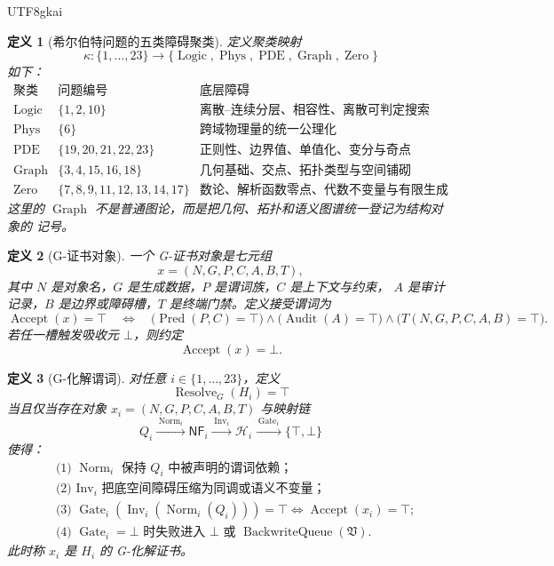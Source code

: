 \documentclass[12pt]{article}
\newtheorem{definition}{定义}[section]
\newcommand{\Vsys}{\mathfrak V}
\newcommand{\NF}{\mathsf{NF}}
\newcommand{\CertTuple}{(N,G,P,C,A,B,T)}
\newcommand{\Hcal}{\mathcal{H}}
\DeclareMathOperator{\Pred}{Pred}
\DeclareMathOperator{\Audit}{Audit}
\DeclareMathOperator{\Accept}{Accept}
\DeclareMathOperator{\Resolve}{Resolve}
\DeclareMathOperator{\Norm}{Norm}
\DeclareMathOperator{\Gate}{Gate}
\DeclareMathOperator{\Inv}{Inv}
\DeclareMathOperator{\BackwriteQueue}{BackwriteQueue}
\DeclareMathOperator{\Graph}{Graph}
\DeclareMathOperator{\Zero}{Zero}
\DeclareMathOperator{\PDE}{PDE}
\DeclareMathOperator{\Phys}{Phys}
\DeclareMathOperator{\Logic}{Logic}
\begin{document}
\begin{CJK*}{UTF8}{gkai}
\begin{definition}[希尔伯特问题的五类障碍聚类]
\label{def:tex59-cluster}
定义聚类映射
\[
  \kappa:\{1,\ldots,23\}\longrightarrow
  \{\Logic,\Phys,\PDE,\Graph,\Zero\}
\]
如下：
\[
\begin{array}{c|l|l}
\text{聚类} & \text{问题编号} & \text{底层障碍}\\ \hline
\Logic & \{1,2,10\} & \text{离散--连续分层、相容性、离散可判定搜索}\\
\Phys & \{6\} & \text{跨域物理量的统一公理化}\\
\PDE & \{19,20,21,22,23\} & \text{正则性、边界值、单值化、变分与奇点}\\
\Graph & \{3,4,15,16,18\} & \text{几何基础、交点、拓扑类型与空间铺砌}\\
\Zero & \{7,8,9,11,12,13,14,17\} & \text{数论、解析函数零点、代数不变量与有限生成}
\end{array}
\]
这里的 \(\Graph\) 不是普通图论，而是把几何、拓扑和语义图谱统一登记为结构对象的
记号。
\end{definition}

\begin{definition}[G-证书对象]
\label{def:tex59-certificate-object}
一个 G-证书对象是七元组
\[
  x=\CertTuple,
\]
其中 \(N\) 是对象名，\(G\) 是生成数据，\(P\) 是谓词族，\(C\) 是上下文与约束，
\(A\) 是审计记录，\(B\) 是边界或障碍槽，\(T\) 是终端门禁。定义接受谓词为
\[
  \Accept(x)=\top
  \quad\Longleftrightarrow\quad
  \bigl(\Pred(P,C)=\top\bigr)
  \wedge
  \bigl(\Audit(A)=\top\bigr)
  \wedge
  \bigl(T(N,G,P,C,A,B)=\top\bigr).
\]
若任一槽触发吸收元 \(\bot\)，则约定
\[
  \Accept(x)=\bot.
\]
\end{definition}

\begin{definition}[G-化解谓词]
\label{def:tex59-resolution}
对任意 \(i\in\{1,\ldots,23\}\)，定义
\[
  \Resolve_G(H_i)=\top
\]
当且仅当存在对象 \(x_i=\CertTuple\) 与映射链
\[
  Q_i
  \xrightarrow{\;\Norm_i\;}
  \NF_i
  \xrightarrow{\;\Inv_i\;}
  \Hcal_i
  \xrightarrow{\;\Gate_i\;}
  \{\top,\bot\}
\]
使得：
\[
\begin{aligned}
&\text{(1) } \Norm_i \text{ 保持 } Q_i \text{ 中被声明的谓词依赖；}\\
&\text{(2) } \Inv_i \text{ 把底空间障碍压缩为同调或语义不变量；}\\
&\text{(3) } \Gate_i(\Inv_i(\Norm_i(Q_i)))=\top \Longleftrightarrow \Accept(x_i)=\top;\\
&\text{(4) } \Gate_i=\bot \text{ 时失败进入 } \bot \text{ 或 } \BackwriteQueue(\Vsys).
\end{aligned}
\]
此时称 \(x_i\) 是 \(H_i\) 的 G-化解证书。
\end{definition}


\end{CJK*}
\end{document}
